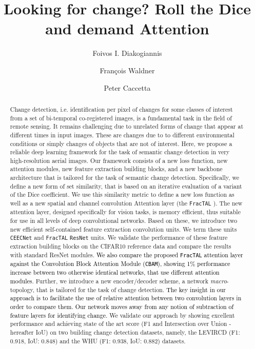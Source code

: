 \documentclass[times, 5p]{elsarticle}
\def \FracTAL {\texttt{FracTAL} }
\newcommand{\ceecnet}{\texttt{CEECNet}}
\begin{document}
\begin{frontmatter}
\title{Looking for change? Roll the Dice and demand Attention}
\author[ICRAR,data61]{Foivos I. Diakogiannis}
\author[CSIROAF]{Fran\c{c}ois Waldner}
\author[data61]{Peter Caccetta}


\address[ICRAR]{ICRAR, the University of Western Australia}
\address[data61]{Data61, CSIRO, Floreat WA}
\address[CSIROAF]{CSIRO Agriculture \& Food, St Lucia, QLD, Australia}




\begin{abstract}
Change detection, i.e. identification per pixel of changes for some classes of interest from a set of bi-temporal co-registered
images, is a fundamental task in the field of remote sensing. It remains challenging due to unrelated forms of change that appear
at different times in input images. These are changes due to to different environmental conditions or simply changes of objects
that are not of interest.
Here, we propose a reliable deep learning framework for the task of  semantic change detection in very high-resolution aerial images.  Our framework consists of a new loss function,  new attention modules, new feature extraction building blocks, and a new backbone architecture that is tailored for the task of semantic change detection. 
Specifically,  we define a new form of set similarity, that is based on an iterative evaluation of a variant of the Dice coefficient. We use this similarity metric to define a new loss function as well as a new spatial and channel convolution Attention layer (the \FracTAL).  The new attention layer, designed specifically for vision tasks, is memory efficient, thus suitable for use in all levels of deep convolutional networks. 
Based on these, we introduce two new efficient self-contained feature extraction  convolution units.  We term these units  \ceecnet{} and  \FracTAL \texttt{ResNet}  units. We validate  the performance of these feature extraction building blocks on the CIFAR10 reference data  and compare the results with  standard ResNet modules. \textcolor{black}{We also compare the proposed \FracTAL attention layer against the Convolution Block Attention Module (\texttt{CBAM}), showing 1\% performance increase between two otherwise identical networks, that use different attention modules}. 
Further, we introduce a new encoder/decoder scheme, a network \emph{macro}-topology, that is tailored for the task of change detection.   
\textcolor{black}{The key insight in our approach is to facilitate the use of relative attention between two convolution layers in order to compare them.  Our network moves away from any notion of subtraction of feature layers for identifying change.}
We validate our approach by showing excellent performance  and achieving state of the art score (F1 and Intersection over Union - hereafter IoU) on two building change detection datasets, namely, the LEVIRCD (F1: 0.918, IoU: 0.848) and the  WHU (F1: 0.938, IoU: 0.882) datasets. 
\end{abstract}


\end{frontmatter}
\end{document}
